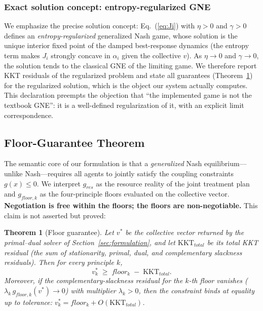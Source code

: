 \documentclass[11pt]{article}
\newtheorem{theorem}{Theorem}
\begin{document}
\subsubsection{Exact solution concept: entropy-regularized GNE}
\label{sec:solution-concept}
We emphasize the precise solution concept: Eq.~(\ref{eq:Ji}) with $\eta>0$
and $\gamma>0$ defines an \emph{entropy-regularized} generalized Nash game,
whose solution is the unique interior fixed point of the damped best-response
dynamics (the entropy term makes $J_i$ strongly concave in $\alpha_i$ given
the collective $v$). As $\eta \to 0$ and $\gamma \to 0$, the solution tends
to the classical GNE of the limiting game. We therefore report KKT residuals
of the regularized problem and state all guarantees (Theorem~\ref{thm:floor})
for the regularized solution, which is the object our system actually
computes. This declaration preempts the objection that ``the implemented
game is not the textbook GNE'': it is a well-defined regularization of it,
with an explicit limit correspondence.

\subsection{Floor-Guarantee Theorem}
\label{sec:theorem}
The semantic core of our formulation is that a \emph{generalized} Nash
equilibrium---unlike Nash---requires all agents to jointly satisfy the
coupling constraints $g(x)\le0$. We interpret $g_{res}$ as the resource
reality of the joint treatment plan and $g_{floor,k}$ as the four-principle
floors evaluated on the collective vector. \textbf{Negotiation is free within
the floors; the floors are non-negotiable.} This claim is not asserted but
proved:

\begin{theorem}[Floor guarantee]
\label{thm:floor}
Let $v^{*}$ be the collective vector returned by the primal--dual solver of
Section~\ref{sec:formulation}, and let $\mathrm{KKT}_{total}$ be its total
KKT residual (the sum of stationarity, primal, dual, and complementary
slackness residuals). Then for every principle $k$,
\begin{equation}
  v^{*}_k \;\ge\; floor_k \;-\; \mathrm{KKT}_{total}.
  \label{eq:floor-guarantee}
\end{equation}
Moreover, if the complementary-slackness residual for the $k$-th floor
vanishes ($\lambda_k\, g_{floor,k}(v^{*}) \to 0$) with multiplier
$\lambda_k > 0$, then the constraint binds at equality up to tolerance:
$v^{*}_k = floor_k + O(\mathrm{KKT}_{total})$.
\end{theorem}
\end{document}

